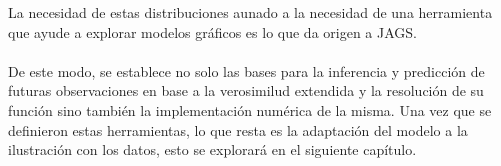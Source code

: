 La necesidad de estas distribuciones aunado a la necesidad de una herramienta que ayude a explorar modelos gr\'aficos es lo que da origen a JAGS.\\
\\
De este modo, se establece no solo las bases para la inferencia y predicci\'on de futuras observaciones en base a la verosimilud extendida y la resoluci\'on de su funci\'on sino tambi\'en la implementaci\'on num\'erica de la misma. Una vez que se definieron estas herramientas, lo que resta es la adaptaci\'on del modelo a la ilustraci\'on con los datos, esto se explorar\'a en el siguiente cap\'itulo.  